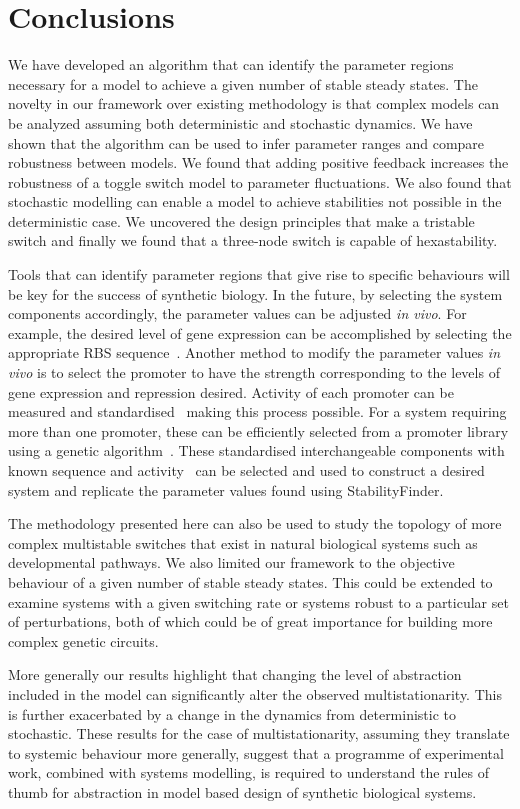 \section{Conclusions}
We have developed an algorithm that can identify the parameter regions necessary for a model to achieve a given number of stable steady states. The novelty in our framework over existing methodology is that complex models can be analyzed assuming both deterministic and stochastic dynamics. We have shown that the algorithm can be used to infer parameter ranges and compare robustness between models. We found that adding positive feedback increases the robustness of a toggle switch model to parameter fluctuations. We also found that stochastic modelling can enable a model to achieve stabilities not possible in the deterministic case. We uncovered the design principles that make a tristable switch and finally we found that a three-node switch is capable of hexastability.
\par
Tools that can identify parameter regions that give rise to specific behaviours will be key for the success of synthetic biology. In the future, by selecting the system components accordingly, the parameter values can be adjusted \textit{in vivo}. For example, the desired level of gene expression can be accomplished by selecting the appropriate RBS sequence~\autocite{Salis:2009gk}. Another method to modify the parameter values \textit{in vivo} is to select the promoter to have the strength corresponding to the levels of gene expression and repression desired. Activity of each promoter can be measured and standardised~\autocite{Kelly:2009bj} making this process possible. For a system requiring more than one promoter, these can be efficiently selected from a promoter library using a genetic algorithm~\autocite{Wu:2011bq}. These standardised interchangeable components with known sequence and activity~\autocite{Kelly:2009bj,Canton:2008fv} can be selected and used to construct a desired system and replicate the parameter values found using StabilityFinder.
\par
The methodology presented here can also be used to study the topology of more complex multistable switches that exist in natural biological systems such as developmental pathways. We also limited our framework to the objective behaviour of a given number of stable steady states. This could be extended to examine systems with a given switching rate or systems robust to a particular set of perturbations, both of which could be of great importance for building more complex genetic circuits.
\par
More generally our results highlight that changing the level of abstraction included in the model can significantly alter the observed multistationarity. This is further exacerbated by a change in the dynamics from deterministic to stochastic. These results for the case of multistationarity, assuming they translate to systemic behaviour more generally, suggest that a programme of experimental work, combined with systems modelling, is required to understand the rules of thumb for abstraction in model based design of synthetic biological systems.   

